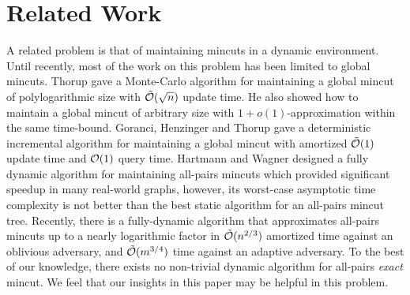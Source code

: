 \section{Related Work} 
A related problem is that of maintaining mincuts in a dynamic environment. Until recently, most of the work on this problem has been limited to global mincuts. Thorup \cite{DBLP:journals/combinatorica/Thorup07} gave a Monte-Carlo algorithm for maintaining a global mincut of polylogarithmic size with ${\tilde {\cal O}}(\sqrt{n})$ update time.  He also showed how to maintain a global mincut of arbitrary size with $1+o(1)$-approximation within the same time-bound. Goranci, Henzinger and Thorup \cite{DBLP:journals/talg/GoranciHT18} gave a deterministic incremental algorithm for maintaining a global mincut with amortized ${\tilde{\cal O}}(1)$ update time and ${\cal O}(1)$ query time. Hartmann and Wagner \cite{DBLP:conf/isaac/HartmannW12} designed a fully dynamic algorithm for maintaining all-pairs mincuts  which provided significant speedup in many real-world graphs, however, its worst-case asymptotic time complexity is not better than the best static algorithm for an all-pairs mincut tree. Recently, there is a fully-dynamic algorithm \cite{DBLP:journals/corr/abs-2005-02368} that approximates all-pairs mincuts up to a nearly logarithmic factor in ${\tilde{\cal O}}(n^{2/3} )$ amortized time against an oblivious adversary, and ${\tilde{\cal O}}(m^{3/4} )$ time against an adaptive adversary. To the best of our knowledge, there exists no non-trivial dynamic algorithm for all-pairs \textit{exact} mincut. We feel that our insights in this paper may be helpful in this problem.

\noindent




